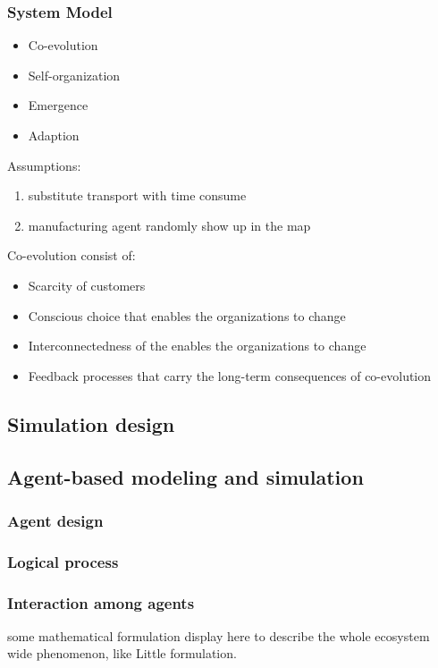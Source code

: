 \subsubsection{System Model}
\begin{itemize}
    \item Co-evolution
    \item Self-organization
    \item Emergence 
    \item Adaption
\end{itemize}

Assumptions:
\begin{enumerate}
    \item substitute transport with time consume
    \item manufacturing agent randomly show up in the map
\end{enumerate}

Co-evolution consist of:
\begin{itemize}
    \item Scarcity of customers
    \item Conscious choice that enables the organizations to change
    \item Interconnectedness of the enables the organizations to change
    \item Feedback processes that carry the long-term consequences of co-evolution
\end{itemize}


\subsection{Simulation design} %
\label{sub:simulation_design}


\subsection{Agent-based modeling and simulation} %
\label{sub:agent_based_modeling_and_simulation}
\subsubsection{Agent design}

\subsubsection{Logical process}

\subsubsection{Interaction among agents}
some mathematical formulation display here to describe the whole ecosystem wide phenomenon, like Little formulation.


